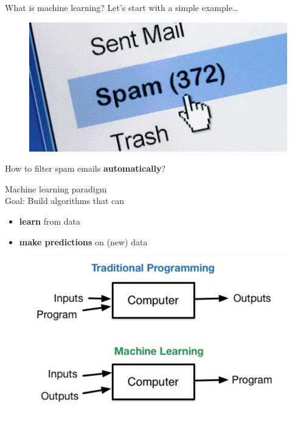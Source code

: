 \documentclass{beamer}
\begin{document}
\begin{frame}{What is machine learning?}
\vfill
Let's start with a simple example\ldots
\vfill
\begin{figure}
\centering
\includegraphics[width=\textwidth]{images/spam.jpg}
\end{figure}
\vfill
How to filter spam emails \textbf{automatically}?
\vfill
\end{frame}

\begin{frame}{Machine learning paradigm}
~\\
\vfill
Goal: Build algorithms that can 
\begin{itemize}
	\item \textbf{learn} from data
	\item \textbf{make predictions} on (new) data
\end{itemize}
\vfill
\pause
\begin{figure}
\centering
\includegraphics[width=\textwidth]{images/ml_vs_traditional.jpg}
\end{figure}
\vfill
\end{frame}
\end{document}

